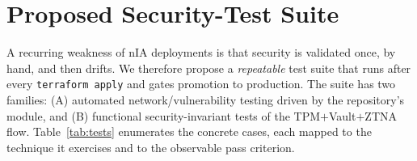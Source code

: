 \documentclass[journal]{IEEEtran}
\newcommand{\ttcmd}[1]{\texttt{\seqsplit{#1}}}
\begin{document}
\section{Proposed Security-Test Suite}\label{sec:tests}
A recurring weakness of nIA deployments is that security is validated once, by
hand, and then drifts. We therefore propose a \emph{repeatable} test suite that
runs after every \texttt{terraform apply} and gates promotion to production.
The suite has two families: (A) automated network/vulnerability testing driven
by the repository's \ttcmd{pentest/} module, and (B) functional
security-invariant tests of the TPM$+$Vault$+$ZTNA flow. Table~\ref{tab:tests}
enumerates the concrete cases, each mapped to the technique it exercises and to
the observable pass criterion.
\end{document}
